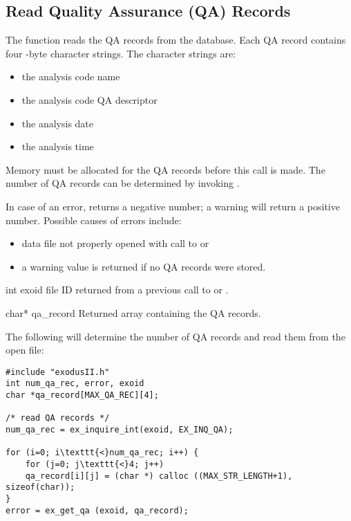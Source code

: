 \subsection{Read Quality Assurance (QA) Records}

The function  reads the QA records from the
database. Each QA record contains four -byte
character strings. The character strings are:

\begin{itemize}
\item the analysis code name
\item the analysis code QA descriptor
\item the analysis date
\item the analysis time
\end{itemize}

Memory must be allocated for the QA records before this call is
made. The number of QA records can be determined by invoking
.

In case of an error,  returns a negative number; a
warning will return a positive number.  Possible causes of errors
include:

\begin{itemize}
 \item data file not properly opened with call to  or

 \item a warning value is returned if no QA records were stored.
\end{itemize}


\begin{parameters}
\item[{int exoid \R{}}]
\exo{} file ID returned from a previous call to 
or .

\item[{char* qa_record \W{}}]
Returned array containing the QA records.
\end{parameters}


The following will determine the number of QA records and
read them from the open \exo{} file:

\begin{lstlisting}
#include "exodusII.h"
int num_qa_rec, error, exoid
char *qa_record[MAX_QA_REC][4];

/* read QA records */
num_qa_rec = ex_inquire_int(exoid, EX_INQ_QA);

for (i=0; i\texttt{<}num_qa_rec; i++) {
    for (j=0; j\texttt{<}4; j++)
    qa_record[i][j] = (char *) calloc ((MAX_STR_LENGTH+1), sizeof(char));
}
error = ex_get_qa (exoid, qa_record);
\end{lstlisting}



